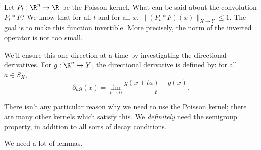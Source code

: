 

Let $P_t: \R^n \to \R$ be the Poisson kernel. What can be said about the convolution $P_t * F$? We know that for all $t$ and for all $x$, $\|(P_t * F)(x)\|_{X \to Y} \le 1$. The goal is to make this function invertible. More precisely, the norm of the inverted operator is not too small. 

We'll ensure this one direction at a time by investigating the directional derivatives. For $g: \R^n \to Y$, the directional derivative is defined by: for all $a \in S_X$, \[\partial_a g(x) = \lim_{t \to 0} \frac{g(x + ta) - g(x)}{t}.\]

There isn't any particular reason why we need to use the Poisson kernel; there are many other kernels which satisfy this. We \emph{definitely} need the semigroup property, in addition to all sorts of decay conditions. 

We need a lot of lemmas.

